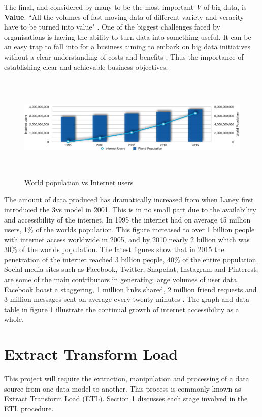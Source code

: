 The final, and considered by many to be the most important \textit{V} of big data, is \textbf{Value}. ``All the volumes of fast-moving data of different variety and veracity have to be turned into value" \cite{ibm}. One of the biggest challenges faced by organisations is having the ability to turn data into something useful. It can be an easy trap to fall into for a business aiming to embark on big data initiatives without a clear understanding of costs and benefits \cite{bigdata}. Thus the importance of establishing clear and achievable business objectives.

\begin{figure}[h]\begin{center}\includegraphics[height=5cm,width=1\linewidth]{images/worldpopgraph}\caption{World population vs Internet users}\label{fig:worldpop}\end{center}\end{figure}
The amount of data produced has dramatically increased from when Laney first introduced the 3vs model in 2001. This is in no small part due to the availability and accessibility of the internet. In 1995 the internet had on average 45 million users, 1\% of the worlds population. This figure increased to over 1 billion people with internet access worldwide in 2005, and by 2010 nearly 2 billion which was 30\% of the worlds population. The latest figures show that in 2015 the penetration of the internet reached 3 billion people, 40\% of the entire population. Social media sites such as Facebook, Twitter, Snapchat, Instagram and Pinterest, are some of the main contributors in generating large volumes of user data. Facebook boast a staggering, 1 million links shared, 2 million friend requests and 3 million messages sent on average every twenty minutes \cite{statref}. The graph and data table in figure \ref{fig:worldpop} illustrate the continual growth of internet accessibility as a whole.

\section{Extract Transform Load}\label{etlprocess}
This project will require the extraction, manipulation and processing of a data source from one data model to another. This process is commonly known as Extract Transform Load (ETL). Section \ref{etlprocess} discusses each stage involved in the ETL procedure. 

